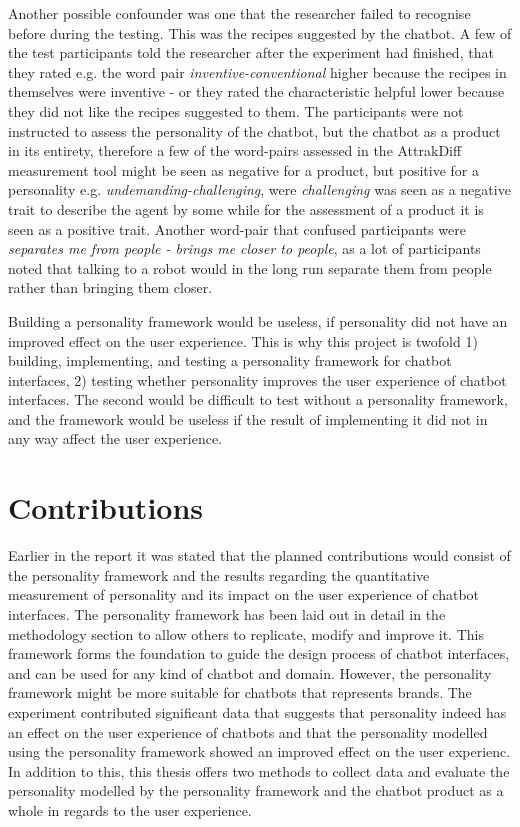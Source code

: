 Another possible confounder was one that the researcher failed to recognise before during the testing. This was the recipes suggested by the chatbot. A few of the test participants told the researcher after the experiment had finished, that they rated e.g. the word pair \textit{inventive-conventional} higher because the recipes in themselves were inventive - or they rated the characteristic helpful lower because they did not like the recipes suggested to them. The participants were not instructed to assess the personality of the chatbot, but the chatbot as a product in its entirety, therefore a few of the word-pairs assessed in the AttrakDiff measurement tool might be seen as negative for a product, but positive for a personality e.g. \textit{undemanding-challenging}, were \textit{challenging} was seen as a negative trait to describe the agent by some while for the assessment of a product it is seen as a positive trait. Another word-pair that confused participants were \textit{separates me from people - brings me closer to people}, as a lot of participants noted that talking to a robot would in the long run separate them from people rather than bringing them closer.

Building a personality framework would be useless, if personality did not have an improved effect on the user experience. This is why this project is twofold 1) building, implementing, and testing a personality framework for chatbot interfaces, 2) testing whether personality improves the user experience of chatbot interfaces. The second would be difficult to test without a personality framework, and the framework would be useless if the result of implementing it did not in any way affect the user experience.

\section{Contributions}

Earlier in the report it was stated that the planned contributions would consist of the personality framework and the results regarding the quantitative measurement of personality and its impact on the user experience of chatbot interfaces. The personality framework has been laid out in detail in the methodology section to allow others to replicate, modify and improve it. This framework forms the foundation to guide the design process of chatbot interfaces, and can be used for any kind of chatbot and domain. However, the personality framework might be more suitable for chatbots that represents brands. The experiment contributed significant data that suggests that personality indeed has an effect on the user experience of chatbots and that the personality modelled using the personality framework showed an improved effect on the user experienc. In addition to this, this thesis offers two methods to collect data and evaluate the personality modelled by the personality framework and the chatbot product as a whole in regards to the user experience. 

